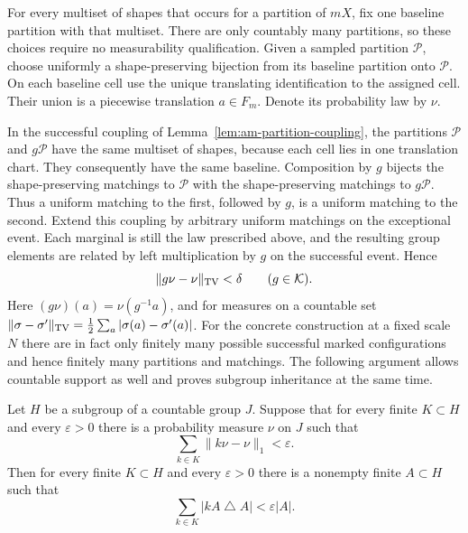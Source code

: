 For every multiset of shapes that occurs for a partition of $mX$, fix one
baseline partition with that multiset.  There are only countably many
partitions, so these choices require no measurability qualification.
Given a sampled partition $\mathcal P$, choose uniformly a shape-preserving
bijection from its baseline partition onto $\mathcal P$.  On each baseline
cell use the unique translating identification to the assigned cell.
Their union is a piecewise translation $a\in F_m$.  Denote its probability
law by $\nu$.

In the successful coupling of Lemma~\ref{lem:am-partition-coupling}, the
partitions $\mathcal P$ and $g\mathcal P$ have the same multiset of
shapes, because each cell lies in one translation chart.  They consequently
have the same baseline.  Composition by $g$ bijects the shape-preserving
matchings to $\mathcal P$ with the shape-preserving matchings to
$g\mathcal P$.  Thus a uniform matching to the first, followed by $g$, is
a uniform matching to the second.  Extend this coupling by arbitrary
uniform matchings on the exceptional event.  Each marginal is still the
law prescribed above, and the resulting group elements are related by
left multiplication by $g$ on the successful event.  Hence
\begin{equation}\label{eq:am-reiter}
 \|g\nu-\nu\|_{\mathrm{TV}}<\delta
 \qquad(g\in\mathcal K).
\end{equation}
Here $(g\nu)(a)=\nu(g^{-1}a)$, and for measures on a countable set
$\|\sigma-\sigma'\|_{\mathrm{TV}}=\frac12\sum_a|\sigma(a)-\sigma'(a)|$.
For the concrete construction at a fixed scale $N$ there are in fact only
finitely many possible successful marked configurations and hence finitely
many partitions and matchings.  The following argument allows countable
support as well and proves subgroup inheritance at the same time.

\begin{lemma}\label{lem:am-reiter-folner}
Let $H$ be a subgroup of a countable group $J$.  Suppose that for every
finite $K\subset H$ and every $\varepsilon>0$ there is a probability
measure $\nu$ on $J$ such that
\[
 \sum_{k\in K}\|k\nu-\nu\|_1<\varepsilon.
\]
Then for every finite $K\subset H$ and every $\varepsilon>0$ there is a
nonempty finite $A\subset H$ such that
\[
 \sum_{k\in K}|kA\mathbin\triangle A|<\varepsilon|A|.
\]
\end{lemma}

